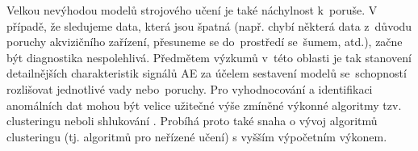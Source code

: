Velkou nevýhodou modelů strojového učení je také náchylnost k~poruše.
V případě, že sledujeme data, která jsou špatná (např. chybí některá data
z~důvodu poruchy akvizičního zařízení, přesuneme se do~prostředí se~šumem, atd.), začne být 
diagnostika nespolehlivá. Předmětem výzkumů v~této oblasti je tak stanovení
detailnějších charakteristik
signálů AE za účelem sestavení modelů se~schopností rozlišovat jednotlivé vady nebo~poruchy.
Pro vyhodnocování a identifikaci anomálních dat mohou být velice užitečné
výše zmíněné výkonné algoritmy tzv. clusteringu neboli shlukování \cite{Cia}.
Probíhá proto také snaha o vývoj algoritmů clusteringu
(tj. algoritmů pro neřízené učení) s vyšším výpočetním výkonem.





